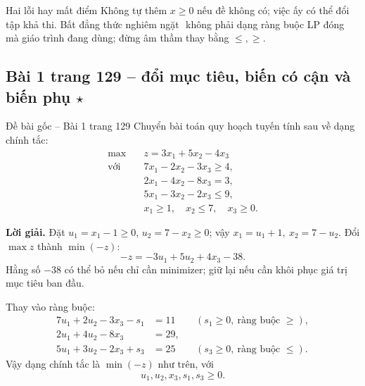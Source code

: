 \documentclass[11pt,a4paper]{article}
\begin{document}
\begin{warningbox}{Hai lỗi hay mất điểm}
Không tự thêm \(x\ge0\) nếu đề không có; việc ấy có thể đổi tập khả thi. Bất đẳng thức nghiêm ngặt \(<,>\) không phải dạng ràng buộc LP đóng mà giáo trình đang dùng; đừng âm thầm thay bằng \(\le,\ge\).
\end{warningbox}

\clearpage
\subsection{Bài 1 trang 129 -- đổi mục tiêu, biến có cận và biến phụ \(\star\)}
\begin{questionbox}{Đề bài gốc -- Bài 1 trang 129}
Chuyển bài toán quy hoạch tuyến tính sau về dạng chính tắc:
\[
\begin{aligned}
\max\quad &z=3x_1+5x_2-4x_3\\
\text{với }&7x_1-2x_2-3x_3\ge4,\\
&2x_1-4x_2-8x_3=3,\\
&5x_1-3x_2-2x_3\le9,\\
&x_1\ge1,\quad x_2\le7,\quad x_3\ge0.
\end{aligned}
\]
\end{questionbox}
\textbf{Lời giải.}
Đặt \(u_1=x_1-1\ge0\), \(u_2=7-x_2\ge0\); vậy \(x_1=u_1+1,\ x_2=7-u_2\). Đổi \(\max z\) thành \(\min(-z)\):
\[
-z=-3u_1+5u_2+4x_3-38.
\]
Hằng số \(-38\) có thể bỏ nếu chỉ cần minimizer; giữ lại nếu cần khôi phục giá trị mục tiêu ban đầu.

Thay vào ràng buộc:
\[
\begin{aligned}
7u_1+2u_2-3x_3-s_1&=11 &&(s_1\ge0,\ \text{ràng buộc }\ge),\\
2u_1+4u_2-8x_3&=29,\\
5u_1+3u_2-2x_3+s_3&=25 &&(s_3\ge0,\ \text{ràng buộc }\le).
\end{aligned}
\]
Vậy dạng chính tắc là \(\min(-z)\) như trên, với
\[
u_1,u_2,x_3,s_1,s_3\ge0.
\]

\clearpage
\end{document}
